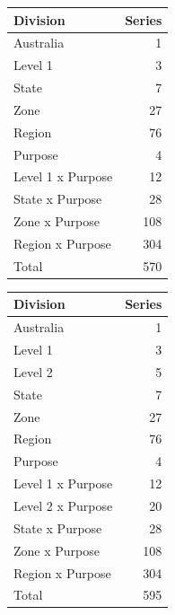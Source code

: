 \documentclass[11pt,a4paper,]{article}
\let\origtable\table
\let\endorigtable\endtable
\renewenvironment{table}[1][2] {
    \expandafter\origtable\expandafter[!htbp]
} {
    \endorigtable
}
\begin{document}
\begin{table}[!h]

\caption{\label{tab:simlevel1}Number of simulated Australian domestic tourism series at each aggregation level - adding one hierarchy variable (Level 1)}
\centering
\begin{tabular}[t]{lr}
\toprule
Division & Series\\
\midrule
Australia & 1\\
Level 1 & 3\\
State & 7\\
Zone & 27\\
Region & 76\\
Purpose & 4\\
Level 1 x Purpose & 12\\
State x Purpose & 28\\
Zone x Purpose & 108\\
Region x Purpose & 304\\
\hline
Total & 570\\
\bottomrule
\end{tabular}
\end{table}

\begin{table}[!h]

\caption{\label{tab:simlevel1level2}Number of simulated Australian domestic tourism series at each aggregation level - adding two hierarchy variables (Level 1 and Level 2)}
\centering
\begin{tabular}[t]{lr}
\toprule
Division & Series\\
\midrule
Australia & 1\\
Level 1 & 3\\
Level 2 & 5\\
State & 7\\
Zone & 27\\
Region & 76\\
Purpose & 4\\
Level 1 x Purpose & 12\\
Level 2 x Purpose & 20\\
State x Purpose & 28\\
Zone x Purpose & 108\\
Region x Purpose & 304\\
\hline
Total & 595\\
\bottomrule
\end{tabular}
\end{table}
\end{document}
